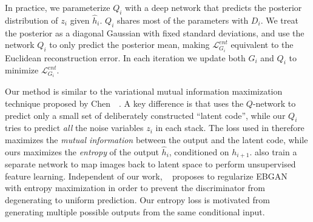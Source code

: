 \documentclass[10pt,twocolumn,letterpaper]{article}
\newcommand{\yixuan}{\textcolor{blue}}
\begin{document}
In practice, we parameterize $Q_{i}$ with a deep network that predicts the posterior distribution of $z_{i}$ given $\hat{h}_{i}$.  $Q_{i}$ shares most of the parameters with $D_{i}$. We treat the posterior as a diagonal Gaussian with fixed standard deviations, and use the network $Q_{i}$ to only predict the posterior mean, making $\mathcal{L}_{G_{i}}^{ent}$  equivalent to the Euclidean reconstruction error. In each iteration we update both $G_{i}$ and $Q_{i}$ to minimize $\mathcal{L}_{G_{i}}^{ent}$. %

Our method is similar to the variational mutual information maximization technique proposed by Chen~\etal~\cite{chen2016infogan}.  A key difference is that \cite{chen2016infogan} uses the $Q$-network to   predict only a small set of deliberately constructed ``latent code'', while our $Q_{i}$ tries to predict \emph{all} the noise variables $z_{i}$ in each stack. The loss used in \cite{chen2016infogan} therefore maximizes the \emph{mutual information} between the output and  the latent code, while ours maximizes the \emph{entropy} of the output $\hat{h}_{i}$, conditioned on ${h}_{i+1}$. \cite{donahue2017adversarial,dumoulin2017adversarially} also train a separate network to map images back to latent space to perform unsupervised feature learning. Independent of our work, ~\cite{dai2017calibrating} proposes to regularize EBGAN~\cite{zhao2016energy} with entropy maximization in order to prevent the discriminator from degenerating to uniform prediction. Our entropy loss is motivated from generating multiple possible outputs from the same conditional input.


\end{document}
